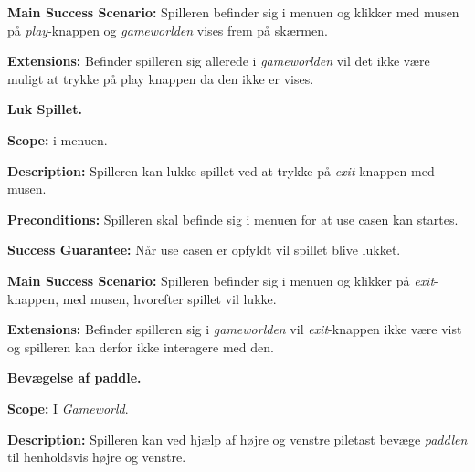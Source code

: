 \textbf{Main Success Scenario:}\newline
Spilleren befinder sig i menuen og klikker med musen på \textit{play}-knappen og \textit{gameworlden} vises frem på skærmen.\newline

\textbf{Extensions:}\newline
Befinder spilleren sig allerede i \textit{gameworlden} vil det ikke være muligt at trykke på play knappen da den ikke er vises.\newline \newline



\textbf{Luk Spillet.}\newline

\textbf{Scope:}\newline
i menuen. \newline

\textbf{Description:} \newline
Spilleren kan lukke spillet ved at trykke på \textit{exit}-knappen med musen.\newline

\textbf{Preconditions:}\newline
Spilleren skal befinde sig i menuen for at use casen kan startes.\newline

\textbf{Success Guarantee:}\newline
Når use casen er opfyldt vil spillet blive lukket. \newline

\textbf{Main Success Scenario:}\newline
Spilleren befinder sig i menuen og klikker på \textit{exit}-knappen, med musen, hvorefter spillet vil lukke.\newline

\textbf{Extensions:}\newline
Befinder spilleren sig i \textit{gameworlden} vil \textit{exit}-knappen ikke være vist og spilleren kan derfor ikke interagere med den. \newline \newline


\textbf{Bevægelse af paddle.}\newline

\textbf{Scope:}\newline
I \textit{Gameworld}.\newline

\textbf{Description:} \newline
Spilleren kan ved hjælp af højre og venstre piletast bevæge \textit{paddlen} til henholdsvis højre og venstre.\newline

